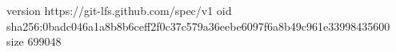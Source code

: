 version https://git-lfs.github.com/spec/v1
oid sha256:0badc046a1a8b8b6ceff2f0c37c579a36eebe6097f6a8b49c961e33998435600
size 699048
